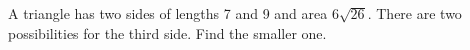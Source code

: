 A triangle has two sides of lengths 7 and 9 and area $6\sqrt{26}$. There are two possibilities for the third side. Find the smaller one.
